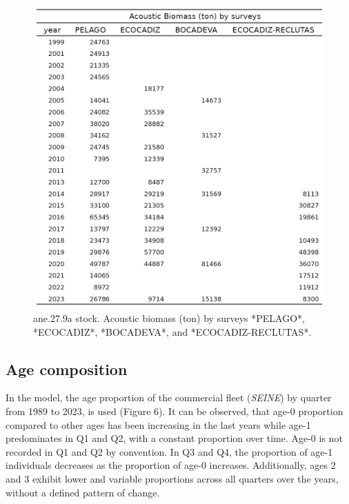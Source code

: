 \documentclass[
]{article}
\begin{document}
\begin{figure}[H]

{\centering \includegraphics[width=0.95\linewidth]{report/run/S1.0_4FLEETS/tb_index} 

}

\caption{ane.27.9a stock. Acoustic biomass (ton) by surveys *PELAGO*, *ECOCADIZ*, *BOCADEVA*, and *ECOCADIZ-RECLUTAS*.   }\label{fig:unnamed-chunk-6}
\end{figure}

\hypertarget{age-composition}{%
\subsection{Age composition}\label{age-composition}}

In the model, the age proportion of the commercial fleet (\emph{SEINE})
by quarter from 1989 to 2023, is used (Figure 6). It can be observed,
that age-0 proportion compared to other ages has been increasing in the
last years while age-1 predominates in Q1 and Q2, with a constant
proportion over time. Age-0 is not recorded in Q1 and Q2 by convention.
In Q3 and Q4, the proportion of age-1 individuals decreases as the
proportion of age-0 increases. Additionally, ages 2 and 3 exhibit lower
and variable proportions across all quarters over the years, without a
defined pattern of change.
\end{document}
